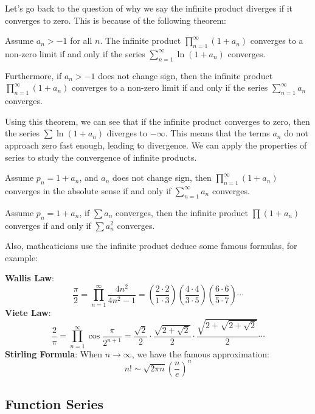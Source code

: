 Let's go back to the question of why we say the infinite product diverges if it converges to zero. This is because of the following theorem:

\begin{theorem}
    Assume $a_n > -1$ for all $n$. The infinite product $\prod_{n=1}^{\infty} (1 + a_n)$ converges to a non-zero limit if and only if the series $\sum_{n=1}^{\infty} \ln(1 + a_n)$ converges.
    
    Furthermore, if $a_n > -1$ does not change sign, then the infinite product $\prod_{n=1}^{\infty} (1 + a_n)$ converges to a non-zero limit if and only if the series $\sum_{n=1}^{\infty} a_n$ converges.
\end{theorem}

Using this theorem, we can see that if the infinite product converges to zero, then the series $\sum \ln(1 + a_n)$ diverges to $-\infty$. This means that the terms $a_n$ do not approach zero fast enough, leading to divergence. We can apply the properties of series to study the convergence of infinite products.

\begin{corollary}
    Assume $p_n = 1 + a_n$, and $a_n$ does not change sign, then $\prod_{n=1}^{\infty} (1+a_n)$ converges in the absolute sense if and only if $\sum_{n=1}^{\infty} a_n$ converges.
\end{corollary}

\begin{corollary}
    Assume $p_n = 1 + a_n$, if $\sum a_n$ converges, then the infinite product $\prod (1+a_n)$ converges if and only if $\sum a_n^2$ converges.
\end{corollary}

Also, matheaticians use the infinite product deduce some famous formulas, for example:

\textbf{Wallis Law}:
\[\frac{\pi}{2} = \prod_{n=1}^{\infty} \frac{4n^2}{4n^2 - 1} = \left(\frac{2 \cdot 2}{1 \cdot 3}\right) \left(\frac{4 \cdot 4}{3 \cdot 5}\right) \left(\frac{6 \cdot 6}{5 \cdot 7}\right) \cdots\]
\textbf{Viete Law}:
\[\frac{2}{\pi} = \prod_{n=1}^{\infty} \cos \frac{\pi}{2^{n+1}} = \frac{\sqrt{2}}{2} \cdot \frac{\sqrt{2 + \sqrt{2}}}{2} \cdot \frac{\sqrt{2 + \sqrt{2 + \sqrt{2}}}}{2} \cdots\]
\textbf{Stirling Formula}:
When $n \to \infty$, we have the famous approximation:
\[n! \sim \sqrt{2\pi n}\left(\frac{n}{e}\right)^n\]


\subsection{Function Series}


